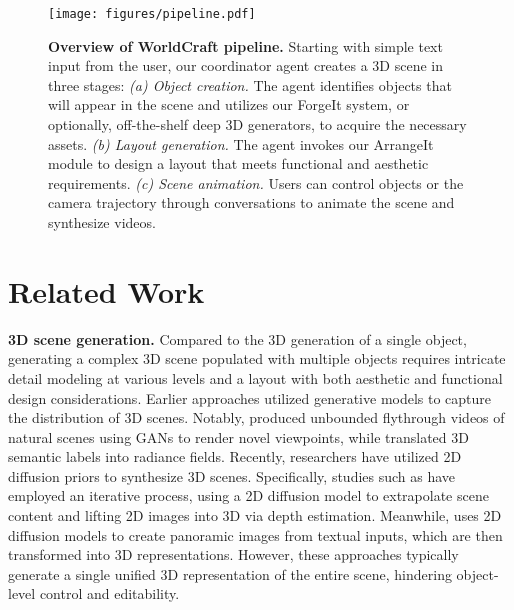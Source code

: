 \begin{figure*}[t]
\begin{center}
    \texttt{[image: figures/pipeline.pdf]}
\end{center}
\caption{\textbf{Overview of WorldCraft pipeline.} Starting with simple text input from the user, our coordinator agent creates a 3D scene in three stages: \emph{(a) Object creation.} The agent identifies objects that will appear in the scene and utilizes our ForgeIt system, or optionally, off-the-shelf deep 3D generators, to acquire the necessary assets.
%
\emph{(b) Layout generation.} 
The agent invokes our ArrangeIt module to design a layout that meets functional and aesthetic requirements.
\emph{(c) Scene animation.} Users can control objects or the camera trajectory through conversations to animate the scene and synthesize videos.
}
\label{fig:pipeline}
\end{figure*}


\section{Related Work}

\noindent\textbf{3D scene generation. }
Compared to the 3D generation of a single object, generating a complex 3D scene populated with multiple objects requires intricate detail modeling at various levels and a layout with both aesthetic and functional design considerations.
%
Earlier approaches \cite{devries2021unconstrained, bautista2022gaudi, chen2023scenedreamer, zhang2023berfscene} utilized generative models to capture the distribution of 3D scenes. Notably, \cite{liu2021infinite, li2022infinitenature} produced unbounded flythrough videos of natural scenes using GANs to render novel viewpoints, while \cite{hao2021gancraft} translated 3D semantic labels into radiance fields.
%
Recently, researchers have utilized 2D diffusion priors to synthesize 3D scenes. Specifically, studies such as \cite{NEURIPS2023_7d62a85e, yu2024wonderjourney, hoellein2023text2room, zhang2024text2nerf, li2025dreamscene} have employed an iterative process, using a 2D diffusion model to extrapolate scene content and lifting 2D images into 3D via depth estimation. Meanwhile, \cite{zhou2025dreamscene360} uses 2D diffusion models to create panoramic images from textual inputs, which are then transformed into 3D representations.
However, these approaches typically generate a single unified 3D representation of the entire scene, hindering object-level control and editability. 

